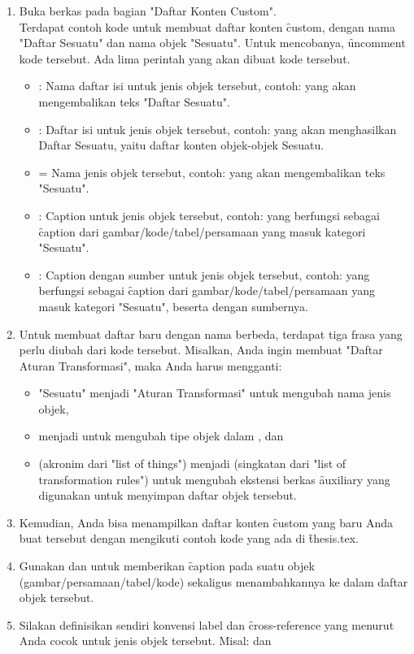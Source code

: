\begin{enumerate}
	\item Buka berkas  pada bagian "Daftar Konten Custom". \\
	Terdapat contoh kode untuk membuat daftar konten \f{custom}, dengan nama "Daftar Sesuatu" dan nama objek "Sesuatu".
	Untuk mencobanya, \f{uncomment} kode tersebut. Ada lima perintah yang akan dibuat kode tersebut.
	\begin{itemize}
		\item {}: Nama daftar isi untuk jenis objek tersebut, contoh:  yang akan mengembalikan teks "Daftar Sesuatu".
		\item {}: Daftar isi untuk jenis objek tersebut, contoh:  yang akan menghasilkan Daftar Sesuatu, yaitu daftar konten objek-objek Sesuatu.
		\item {} = Nama jenis objek tersebut, contoh:  yang akan mengembalikan teks "Sesuatu".
		\item {}: Caption untuk jenis objek tersebut, contoh:  yang berfungsi sebagai \f{caption} dari gambar/kode/tabel/persamaan yang masuk kategori "Sesuatu".
		\item {}: Caption dengan sumber untuk jenis objek tersebut, contoh:  yang berfungsi sebagai \f{caption} dari gambar/kode/tabel/persamaan yang masuk kategori "Sesuatu", beserta dengan sumbernya.
	\end{itemize}
	\item Untuk membuat daftar baru dengan nama berbeda, terdapat tiga frasa yang perlu diubah dari kode tersebut.
	Misalkan, Anda ingin membuat "Daftar Aturan Transformasi", maka Anda harus mengganti:
	\begin{itemize}
		\item "Sesuatu" menjadi "Aturan Transformasi" untuk mengubah nama jenis objek,
		\item {} menjadi  untuk mengubah tipe objek dalam \latex, dan
		\item {} (akronim dari "list of things") menjadi  (singkatan dari "list of transformation rules") untuk mengubah ekstensi berkas \f{auxiliary} yang digunakan untuk menyimpan daftar objek tersebut.
	\end{itemize}
	\item Kemudian, Anda bisa menampilkan daftar konten \f{custom} yang baru Anda buat tersebut dengan mengikuti contoh kode yang ada di \f{thesis.tex}.
	\item Gunakan  dan  untuk memberikan \f{caption} pada suatu objek (gambar/persamaan/tabel/kode) sekaligus menambahkannya ke dalam daftar objek tersebut.
	\item Silakan definisikan sendiri konvensi label dan \f{cross-reference} yang menurut Anda cocok untuk jenis objek tersebut.
	Misal:  dan 
\end{enumerate}


